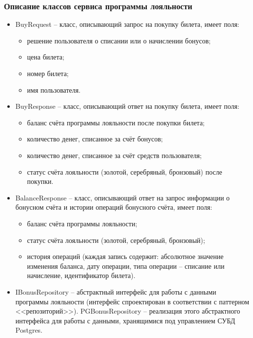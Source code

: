 \subsubsection{Описание классов сервиса программы лояльности}

\begin{itemize}
    \item BuyRequest -- класс, описывающий запрос на покупку билета, имеет поля:
    \begin{itemize}
        \item решение пользователя о списании или о начислении бонусов;
        \item цена билета;
        \item номер билета;
        \item имя пользователя.
    \end{itemize}
    \item BuyResponse -- класс, описывающий ответ на покупку билета, имеет поля:
    \begin{itemize}
        \item баланс счёта программы лояльности после покупки билета;
        \item количество денег, списанное за счёт бонусов;
        \item количество денег, списанное за счёт средств пользователя;
        \item статус счёта лояльности (золотой, серебряный, бронзовый) после покупки.
    \end{itemize}
    \item BalanceResponse -- класс, описывающий ответ на запрос информации о бонусном счёта и истории операций бонусного счёта, имеет поля:
    \begin{itemize}
        \item баланс счёта программы лояльности;
        \item статус счёта лояльности (золотой, серебряный, бронзовый);
        \item история операций (каждая запись содержит: абсолютное значение изменения баланса, дату операции, типа операции -- списание или начисление, идентификатор билета).
    \end{itemize}
    \item IBonusRepository -- абстрактный интерфейс для работы с данными программы лояльности (интерфейс спроектирован в соответствии с паттерном <<репозиторий>>). PGBonusRepository -- реализация этого абстрактного интерфейса для работы с данными, хранящимися под управлением СУБД Postgres.
\end{itemize}

